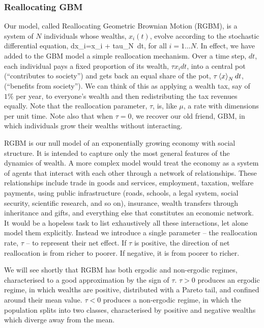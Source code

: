\subsubsection{Reallocating GBM}
Our model, called Reallocating Geometric Brownian Motion (RGBM), is a system of $N$ individuals whose wealths, $x_i(t)$, evolve according to the stochastic differential equation,
\be
dx_i=x_i + tau_N\ dt,
\ee
for all $i=1\dots N$. In effect, we have added to the GBM model a simple reallocation mechanism. Over a time step, $dt$, each individual pays a fixed proportion of its wealth, $\tau x_i dt$, into a central pot (``contributes to society'') and gets back an equal share of the pot, $\tau\left\langle x \right\rangle_N dt$, (``benefits from society''). We can think of this as applying a wealth tax, say of $1\%$ per year, to everyone's wealth and then redistributing the tax revenues equally. Note that the reallocation parameter, $\tau$, is, like $\mu$, a rate with dimensions per unit time. Note also that when $\tau=0$, we recover our old friend, GBM, in which individuals grow their wealths without interacting.

RGBM is our null model of an exponentially growing economy with social structure. It is intended to capture only the most general features of the dynamics of wealth. A more complex model would treat the economy as a system of agents that interact with each other through a network of relationships. These relationships include trade in goods and services, employment, taxation, welfare payments, using public infrastructure (roads, schools, a legal system, social security, scientific research, and so on), insurance, wealth transfers through inheritance and gifts, and everything else that constitutes an economic network. It would be a hopeless task to list exhaustively all these interactions, let alone model them explicitly. Instead we introduce a single parameter -- the reallocation rate, $\tau$ -- to represent their net effect. If $\tau$ is positive, the direction of net reallocation is from richer to poorer. If negative, it is from poorer to richer.

We will see shortly that RGBM has both ergodic and non-ergodic regimes, characterised to a good approximation by the sign of $\tau$. $\tau>0$ produces an ergodic regime, in which wealths are positive, distributed with a Pareto tail, and confined around their mean value. $\tau<0$ produces a non-ergodic regime, in which the population splits into two classes, characterised by positive and negative wealths which diverge away from the mean.

